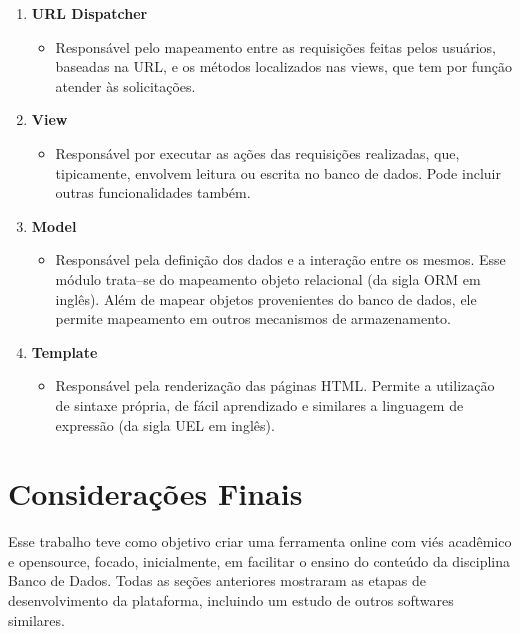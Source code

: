 \documentclass[graduacao,brazil]{ThesisPUC}
\begin{document}
\begin{enumerate}
    \item \textbf{URL Dispatcher}
    \begin{itemize}
	\item Respons\'{a}vel pelo mapeamento entre as requisi\c{c}\~{o}es feitas pelos usu\'{a}rios, baseadas na URL, 
	      e os m\'{e}todos localizados nas views, que tem por fun\c{c}\~{a}o atender \`{a}s solicita\c{c}\~{o}es.
    \end{itemize}
    \item \textbf{View}
    \begin{itemize}
	\item Respons\'{a}vel por executar as a\c{c}\~{o}es das requisi\c{c}\~{o}es realizadas, que, tipicamente,
	      envolvem leitura ou escrita no banco de dados. Pode incluir outras funcionalidades tamb\'{e}m.
    \end{itemize}
    \item \textbf{Model}
    \begin{itemize}
	\item Respons\'{a}vel pela defini\c{c}\~{a}o dos dados e a intera\c{c}\~{a}o entre os mesmos. Esse m\'{o}dulo
	      trata--se do mapeamento objeto relacional (da sigla ORM em ingl\^{e}s). Além de mapear objetos provenientes
	      do banco de dados, ele permite mapeamento em outros mecanismos de armazenamento.
    \end{itemize}
    \item \textbf{Template}
    \begin{itemize}
	\item Respons\'{a}vel pela renderiza\c{c}\~{a}o das p\'{a}ginas HTML. Permite a utiliza\c{c}\~{a}o de sintaxe
	      pr\'{o}pria, de f\'{a}cil aprendizado e similares a linguagem de express\~{a}o (da sigla UEL em ingl\^{e}s).
    \end{itemize}
\end{enumerate}


\chapter{Considera\c{c}\~{o}es Finais}

Esse trabalho teve como objetivo criar uma ferramenta online com vi\'{e}s acad\^{e}mico
e opensource, focado, inicialmente, em facilitar o ensino do conte\'{u}do da disciplina
Banco de Dados. Todas as se\c{c}\~{o}es anteriores mostraram as etapas de desenvolvimento
da plataforma, incluindo um estudo de outros softwares similares.
\end{document}
